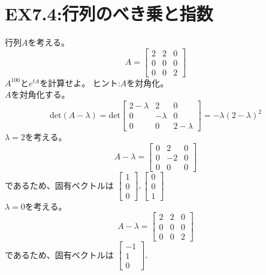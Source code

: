 \documentclass{jsarticle}
\begin{document}

\section{EX7.4:行列のべき乗と指数} 
行列$A$を考える。
\begin{equation}
  A = 
  \begin{bmatrix}
    2&2&0\\
    0&0&0\\
    0&0&2
  \end{bmatrix}
\end{equation}
$A^{100}$と$e^{t A}$を計算せよ。
ヒント:$A$を対角化。
\;\\
$A$を対角化する。
\begin{equation}
  \text{det}(A - \lambda) = \text{det}
  \begin{bmatrix}
    2-\lambda&2&0\\
    0&-\lambda&0\\
    0&0&2-\lambda
  \end{bmatrix}
   = -\lambda(2-\lambda)^2
\end{equation}
$\lambda = 2$を考える。
\begin{equation}
  A-\lambda = \begin{bmatrix}
    0&2&0\\
    0&-2&0\\
    0&0&0
  \end{bmatrix}
\end{equation}
であるため、固有ベクトルは
$\begin{bmatrix}
  1\\0\\0
\end{bmatrix},
\begin{bmatrix}
  0\\0\\1
\end{bmatrix}$\\
$\lambda = 0$を考える。
\begin{equation}
  A-\lambda = \begin{bmatrix}
    2&2&0\\
    0&0&0\\
    0&0&2
  \end{bmatrix}
\end{equation}
であるため、固有ベクトルは
$\begin{bmatrix}
  -1\\1\\0
\end{bmatrix},$
\end{document}

